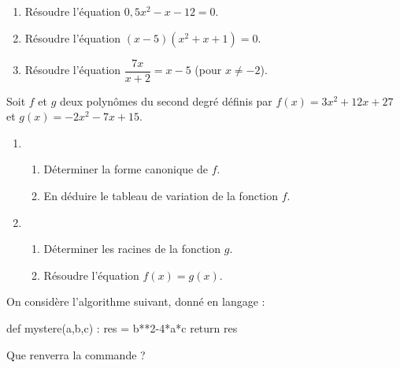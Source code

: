 \documentclass[a4paper,11pt]{article}
\begin{document}
\medskip

%
\begin{enumerate}
	\item Résoudre l'équation $0,5x^2-x-12=0$.
	\item Résoudre l'équation $(x-5)(x^2+x+1)=0$.
	\item Résoudre l'équation $\dfrac{7x}{x+2}={x-5}$ (pour $x \neq -2$).
\end{enumerate}

\medskip


\medskip

Soit $f$ et $g$ deux polynômes du second degré définis par $f(x)=3x^2 + 12x + 27$ et $g(x)=-2x^2-7x+15$.
%
\begin{enumerate}
	\item 
	\begin{enumerate}
		\item Déterminer la forme canonique de $f$.
		\item En déduire le tableau de variation de la fonction $f$.
	\end{enumerate}
	\item 
	\begin{enumerate}
		\item Déterminer les racines de la fonction $g$.
		\item Résoudre l'équation $f(x)=g(x)$.
	\end{enumerate}
\end{enumerate}

\medskip


\medskip

On considère l'algorithme suivant, donné en langage \calgpython{} :
%
\begin{envpython}[8cm]
def mystere(a,b,c) :
	res = b**2-4*a*c
	return res
\end{envpython}
%
Que renverra la commande  ?
\end{document}

